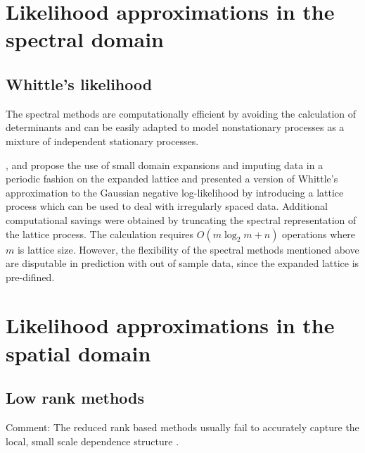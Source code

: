 \documentclass[
12pt, %
a4paper, %
oneside, %
headinclude,footinclude, %
BCOR5mm, %
]{scrartcl}
\begin{document}
\section{Likelihood approximations in the spectral domain}
\subsection{Whittle’s likelihood}

The spectral methods are computationally efficient by avoiding the calculation of determinants and can be easily adapted to model nonstationary processes as a mixture of independent stationary processes.

\href{https://chenyw68.github.io/Literature/[2007]Approximate Likelihood for Large Irregularly Spaced Spatial Data.pdf}{\cite{fuentes2007approximate}}, \href{https://chenyw68.github.io/Literature/[2020]Spectral Density Estimation for Random Fields via Periodic Embeddings.pdf}{\citep{guinness2019spectral}} and \href{https://chenyw68.github.io/Literature/[2017]Circulant Embedding of Approximate Covariances for Inference From Gaussian Data on Large Lattices.pdf}{\citep{guinness2017circulant}} propose the use of small domain expansions and imputing data in a periodic fashion on the expanded lattice and  presented a version of Whittle’s approximation to the Gaussian negative log-likelihood by introducing a lattice process which can be used to deal with irregularly spaced data. Additional computational savings were obtained by truncating the spectral representation of the lattice process. The calculation requires $O(m \log_2 m + n)$ operations where $m$ is lattice size. However, the flexibility of the spectral methods mentioned above are disputable in prediction with out of sample data, since the expanded lattice is pre-difined.

\section{Likelihood approximations in the spatial domain}
\subsection{Low rank methods}
\textcolor[rgb]{1.00,0.00,1.00}{Comment:}
The reduced rank based methods usually fail to accurately capture the local, small scale dependence structure \href{https://chenyw68.github.io/Literature/[2012]A full scale approximation of covariance functions for large spatial data sets.pdf}{\citep{sang2012full}}.
\end{document}
